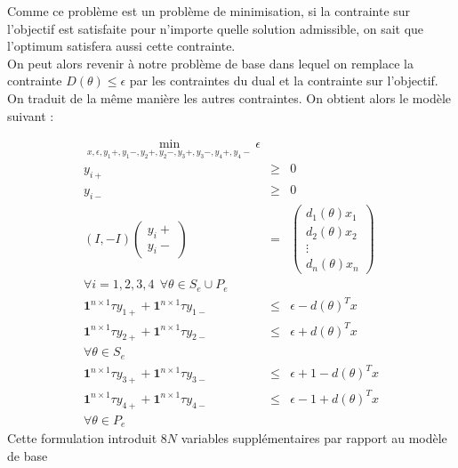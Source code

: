 Comme ce problème est un problème de minimisation, si la contrainte sur l'objectif est satisfaite pour n'importe quelle solution admissible, on sait que l'optimum satisfera aussi cette contrainte.\\
On peut alors revenir à notre problème de base dans lequel on remplace la contrainte $D(\theta)\leq \epsilon$ par les contraintes du dual et la contrainte sur l'objectif.
On traduit de la même manière les autres contraintes. On obtient alors le modèle suivant :

\begin{eqnarray*}
\min_{x,\epsilon ,y_1+,y_1-,y_2+,y_2-,y_3+,y_3-,y_4+,y_4-} \epsilon & & \\
y_{i+} & \geq & 0 \\
y_{i-} & \geq & 0 \\
(I,-I)
 \begin{pmatrix}
y_i+ \\
y_i-
\end{pmatrix}
& = & 
\begin{pmatrix}
d_1(\theta)x_1 \\
d_2(\theta)x_2 \\
\vdots \\
d_n(\theta)x_n 
\end{pmatrix} \\
\forall i = 1,2,3,4\:\:
\forall \theta \in S_e \cup P_e  & & \\
\mathbf{1}^{n\times 1}\tau y_{1+}+\mathbf{1}^{n\times 1}\tau y_{1-} & \leq & \epsilon -d(\theta)^Tx \\
\mathbf{1}^{n\times 1}\tau y_{2+}+\mathbf{1}^{n\times 1}\tau y_{2-} & \leq & \epsilon + d(\theta)^Tx \\
\forall \theta \in S_e & & \\
\mathbf{1}^{n\times 1}\tau y_{3+}+\mathbf{1}^{n\times 1}\tau y_{3-} & \leq & \epsilon +1 -d(\theta)^Tx \\
\mathbf{1}^{n\times 1}\tau y_{4+}+\mathbf{1}^{n\times 1}\tau y_{4-} & \leq & \epsilon -1 + d(\theta)^Tx \\
\forall \theta \in P_e & &
\end{eqnarray*}
Cette formulation introduit $8N$ variables supplémentaires par rapport au modèle de base
\FloatBarrier

